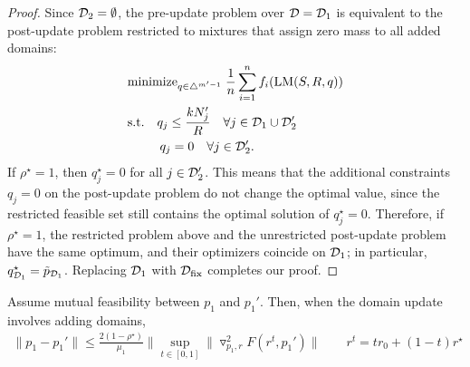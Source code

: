 \begin{proof}
Since $\mathcal{D}_2=\emptyset$, the pre-update problem over $\mathcal{D}=\mathcal{D}_1$ is equivalent to the post-update problem restricted to mixtures that assign zero mass to all added domains:
\begin{align*}
    &\text{minimize}_{q\in\triangle^{m'-1}} \; \frac{1}{n} \sum_{i = 1}^n f_i(\text{LM}(S, R, q)) \\
    &\text{s.t.}\quad q_j \le \frac{kN_j'}{R}\quad \forall j\in\mathcal{D}_1\cup\mathcal{D}_2' \\
    &\qquad\;\; q_j = 0 \quad \forall j\in\mathcal{D}_2'.
\end{align*}
If $\rho^\star=1$, then $q_j^\star=0$ for all $j\in\mathcal{D}_2'$. This means that the additional constraints $q_j=0$ on the post-update problem do not change the optimal value, since the restricted feasible set still contains the optimal solution of $q_j^\star = 0$. Therefore, if $\rho^\star = 1$, the restricted problem above and the unrestricted post-update problem have the same optimum, and their optimizers coincide on $\mathcal{D}_1$; in particular, $q^\star_{\mathcal{D}_1}=\tilde p_{\mathcal{D}_1}$. Replacing $\mathcal{D}_1$ with $\mathcal{D}_{\text{fix}}$ completes our proof.
\end{proof}



\begin{lemma}\label{lemma:add_bound}
Assume mutual feasibility between $p_1$ and $p_1'$. Then, when the domain update involves adding domains,
\begin{align*}
     \| p_1 - p_1' \| \le \frac{2(1 - \rho^\star)}{\mu_1} \| \sup_{t \in [0, 1]}  \| \triangledown_{p_1, r}^2 F(r^t, p_1') \| \qquad r^t = t r_0+(1 - t)r^\star
\end{align*}

\end{lemma}


